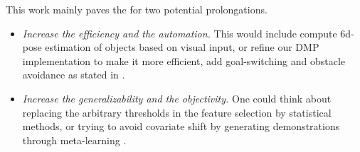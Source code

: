 \documentclass[conference]{IEEEtran}
\begin{document}
This work mainly paves the for two potential prolongations.
\begin{itemize}
    \item \textit{Increase the efficiency and the automation.} This would include compute 6d-pose estimation of objects based on visual input, or refine our DMP implementation to make it more efficient, add goal-switching and obstacle avoidance as stated in \cite{saveriano_dynamic_2021}. 
    
    \item  \textit{Increase the generalizability and the objectivity.} One could think about replacing the arbitrary thresholds in the feature selection by statistical methods, or trying to avoid covariate shift by generating demonstrations through meta-learning \cite{yu_one-shot_2018}.    

\end{itemize}




\vspace{12pt}
\end{document}
